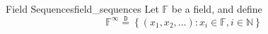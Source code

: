 \begin{definition}
{Field Sequences}{field_sequences}
Let \(\mathbb{F} \) be a field, and define
\[
\mathbb{F} ^{\infty} \stackrel{\mathtt{D}}{ = } \left\{\left(x _{1}, x _{
2}, \ldots\right): x _{i} \in \mathbb{F}, i \in \mathbb{N} \right\}
\]
\end{definition}
